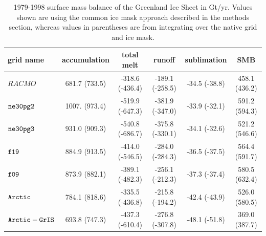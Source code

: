 \documentclass[draft]{agujournal2019}
\begin{document}
 \begin{table}
 \centering
 \scriptsize
 \begin{tabular}{lccccc}
   \hline
   grid name & accumulation & total melt & runoff & sublimation & SMB \\ 
   \hline
   $RACMO$ & 681.7 (733.5) & -318.6 (-436.4) & -189.1 (-258.5) & -34.5 (-38.8) & 458.1 (436.2) \\
   \hline
   $\tt ne30pg2$ & 1007. (973.4) & -519.9 (-647.3) & -381.9 (-347.0) & -33.9 (-32.1) & 591.2 (594.3) \\
   $\tt ne30pg3$ & 931.0 (909.3) & -540.8 (-686.7) & -375.8 (-330.1) & -34.1 (-32.6) & 521.2 (546.6) \\
   $\tt f19$ & 884.9 (913.5) & -414.0 (-546.5) & -284.0 (-284.3) & -36.5 (-37.5) & 564.4 (591.7) \\
   $\tt f09$ & 873.9 (882.1) & -389.1 (-482.3) & -256.1 (-212.3) & -37.3 (-37.4) & 580.5 (632.4) \\
   $\tt Arctic$ & 784.1 (818.6) & -335.5 (-436.8) & -215.8 (-194.2) & -42.4 (-43.9) & 526.0 (580.5) \\
   $\tt Arctic-GrIS$ & 693.8 (747.3) & -437.3 (-610.4) & -276.8 (-307.8) & -48.1 (-51.8) & 369.0 (387.7) \\
 \hline
 \end{tabular}
  \caption{1979-1998 surface mass balance of the Greenland Ice Sheet in Gt/yr. Values shown are using the common ice mask approach described in the methods section, whereas values in parentheses are from integrating over the native grid and ice mask.}
 \label{tbl:table3}
 \end{table}
\end{document}
